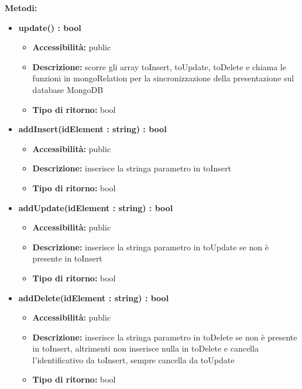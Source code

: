 {{		\textbf{Metodi:}
			\begin{itemize}
			\item \textbf{update() : bool}
				\begin{itemize}
				\item \textbf{Accessibilit\`{a}:} public
				\item \textbf{Descrizione:} scorre gli array toInsert, toUpdate, toDelete e chiama le funzioni in mongoRelation per la sincronizzazione della presentazione sul database MongoDB
				\item \textbf{Tipo di ritorno:} bool
				\end{itemize}
			\item \textbf{addInsert(idElement : string) : bool}
				\begin{itemize}
				\item \textbf{Accessibilit\`{a}:} public
				\item \textbf{Descrizione:} inserisce la stringa parametro in toInsert
				\item \textbf{Tipo di ritorno:} bool
				\end{itemize}
			\item \textbf{addUpdate(idElement : string) : bool}
				\begin{itemize}
				\item \textbf{Accessibilit\`{a}:} public
				\item \textbf{Descrizione:} inserisce la stringa parametro in toUpdate se non \`{e} presente in toInsert
				\item \textbf{Tipo di ritorno:} bool
				\end{itemize}
			\item \textbf{addDelete(idElement : string) : bool}
				\begin{itemize}
				\item \textbf{Accessibilit\`{a}:} public
				\item \textbf{Descrizione:} inserisce la stringa parametro in toDelete se non \`{e} presente in toInsert, altrimenti non inserisce nulla in toDelete e cancella l'identificativo da toInsert, sempre cancella da toUpdate
				\item \textbf{Tipo di ritorno:} bool
				\end{itemize}


			\end{itemize}
	}
 }
	
	
	
	
	
	
	
	
	
	